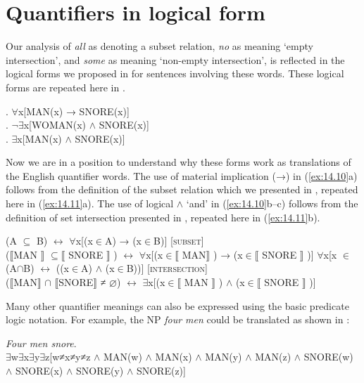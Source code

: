 \section{Quantifiers in logical form}\label{sec:14.3}

Our analysis of \textit{all} as denoting a subset relation, \textit{no} as meaning ‘empty intersection’, and \textit{some} as meaning ‘non-empty intersection’, is reflected in the logical forms we proposed in  for sentences involving these words. These logical forms are repeated here in .


\ea \label{ex:14.10}
.  ${\forall}$x[MAN(x) → SNORE(x)]\\
.  ${\lnot}$${\exists}$x[WOMAN(x) $\wedge$ SNORE(x)]\\
.  ${\exists}$x[MAN(x) $\wedge$ SNORE(x)]
                       \z
\z


Now we are in a position to understand why these forms work as translations of the English quantifier words. The use of material implication (→) in (\ref{ex:14.10}a) follows from the definition of the subset relation which we presented in , repeated here in (\ref{ex:14.11}a). The use of logical $\wedge$ ‘and’ in (\ref{ex:14.10}b--c) follows from the definition of set intersection presented in , repeated here in (\ref{ex:14.11}b).


\ea \label{ex:14.11}
\ea (A ${\subseteq}$ B)  $\leftrightarrow $  ${\forall}$x[(x${\in}$A) → (x${\in}$B)]  [\textsc{subset}]\\
  ($\llbracket$MAN $\rrbracket$  ${\subseteq} \llbracket$ SNORE $\rrbracket$ )  $\leftrightarrow $  ${\forall}$x[(x${\in}\llbracket$ MAN$\rrbracket$ ) → (x${\in}\llbracket$ SNORE $\rrbracket$ )]
\ex  ${\forall}$x[x ${\in}$ (A${\cap}$B)  $\leftrightarrow $  ((x${\in}$A) $\wedge$ (x${\in}$B))]  [\textsc{intersection}]\\
  ($\llbracket$MAN$\rrbracket$ ${\cap}$ $\llbracket$SNORE$\rrbracket$  ≠ ⌀) $\leftrightarrow $  ${\exists}$x[(x${\in}\llbracket$ MAN $\rrbracket$ ) $\wedge$ (x${\in} \llbracket$  SNORE $\rrbracket$ )]
\z \z


Many other quantifier meanings can also be expressed using the basic predicate logic notation. For example, the NP \textit{four men} could be translated as shown in :


\ea \label{ex:14.12}
\textit{Four men snore}.\\
${\exists}$w${\exists}$x${\exists}$y${\exists}$z[w≠x≠y≠z $\wedge$ MAN(w) $\wedge$ MAN(x) $\wedge$ MAN(y) $\wedge$ MAN(z) $\wedge$ SNORE(w) $\wedge$ SNORE(x) $\wedge$ SNORE(y) $\wedge$ SNORE(z)]
\z


